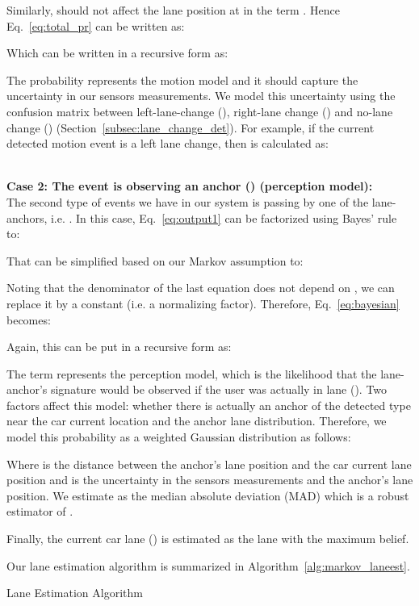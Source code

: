 \documentclass[10pt, conference, compsocconf]{IEEEtran}
\begin{document}
Similarly,  should not affect the lane position at  in the term . Hence Eq.~\ref{eq:total_pr} can be written as:

Which can be written in a recursive form as:

The probability  represents the motion model and it should capture the uncertainty in our sensors measurements. We model this uncertainty using the
confusion matrix between left-lane-change (), right-lane change () and no-lane change () (Section~\ref{subsec:lane_change_det}). For example, if the current detected motion event is a left lane change, then  is calculated as:
\vspace*{-13pt}

\vspace*{5pt}
\\
\textbf{Case 2: The event is observing an anchor () (perception model):}
\\
The second type of events we have in our system is passing by one of the lane-anchors, i.e. .
In this case, Eq.~\ref{eq:output1} can be factorized using Bayes' rule to:

That can be simplified based on our Markov assumption to:

Noting that the denominator of the last equation does not depend on , we can replace it by a constant  (i.e. a normalizing factor). Therefore, Eq.~\ref{eq:bayesian} becomes:

Again, this can be put in a recursive form as:

The term  represents the perception model, which is the likelihood that the lane-anchor's signature  would be observed if the user was actually in lane (). Two factors affect this model: whether there is actually an anchor of the detected type near the car current location and the anchor lane distribution. Therefore, we model this probability as a weighted Gaussian distribution as follows:

Where  is the distance between the  anchor's lane position  and the car current lane position  and  is the uncertainty in the sensors measurements and the anchor's lane position. We estimate  as the median absolute deviation (MAD) which is a robust estimator of  \cite{newson2009hidden}.

Finally, the current car lane () is estimated as the lane with the maximum belief.

Our lane estimation algorithm is summarized in Algorithm~\ref{alg:markov_laneest}.
\begin{algorithm}[!t]\small
\caption{Lane Estimation Algorithm}
\begin{algorithmic}[1]
\State {} \EndFor \While{}
\State 
{} 
\State 
\State 
\EndFor
{} 
\State 
\EndFor
\EndIf
{}
 
\State 
\EndFor
\EndIf
\State  {}
\EndWhile
\end{algorithmic}
\label{alg:markov_laneest}
\end{algorithm}
\end{document}
